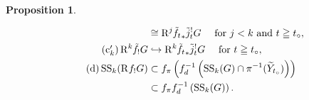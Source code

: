 ﻿\documentclass[a4paper,leqno]{jsarticle}
\theoremstyle{definition}
\newtheorem{Proposition+}[Axiom+]{Proposition}
\numberwithin{equation}{section}
\newcommand{\muS}[1][]{\mathop{\mathrm{SS}}\nolimits_{#1}}
\newcommand{\Rder}[1][]{\mathop{\mathrm{R}^{#1}\hspace{-2pt}}\nolimits}
\theoremstyle{mystyle}
\newcommand{\mpb}[1][]{{#1}_{\pi}} %
\newcommand{\mdiff}[1][]{{#1}_{d}} %
\begin{document}
\begin{Proposition+}
\begin{enumerate}[(i)]
\begin{align}
      &\cong
      \Rder[j]\tilde{f_{t}}_{\ast}\tilde{j}^{!}_{t}G
      \quad
      \text{ for \(j<k\) and \(t\geqq t_\circ\)},\\
      \tag{c\(_k'\)}
      \Rder[k]{\tilde{f}_{!}}G
      &\hookrightarrow
      \Rder[k]\tilde{f_{t}}_{\ast}\tilde{j}^{!}_{t}G
      \quad
      \text{ for \(t\geqq t_\circ\)},\\
      \tag{d}
      \muS[k](\Rder[]{f_{!}}G)
      &\subset
      \mpb[f]\left(\mdiff[f]^{-1}\left(
        \muS[k](G)\cap \pi^{-1}(\widetilde{Y}_{t_{\circ}})
      \right)\right)\\
      \notag&\subset\mpb[f]\mdiff[f]^{-1}\left(
        \muS[k](G)
      \right).
    \end{align}
  \end{enumerate}
\end{Proposition+}
\end{document}
